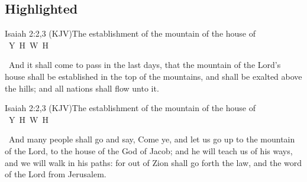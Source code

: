 \documentclass[12pt,aspectratio=169]{beamer}
\newcommand{\YA}{%
    \mbox{%
        Y\makebox[0pt][l]{\hspace{-0.178em}\raisebox{-0.00ex}{\scalebox{0.30}{E}}}%
        H\makebox[0pt][l]{\hspace{-0.010em}\raisebox{-0.00ex}{\scalebox{0.30}{O}}}%
        W\makebox[0pt][l]{\hspace{-0.245em}\raisebox{-0.00ex}{\scalebox{0.30}{A}}}%
        H%
    }%
}
\newcommand{\ver}[1]{%
    \raisebox{0.50ex}{%
        \scalebox{1.1}{%
            \pmb{\textbf{\textcolor{BSpbg}{#1}}}%
        }%
    }%
}
\newcommand{\QUOTE}[1]{%
    \par\noindent\hspace*{0.1\linewidth}%
    \begin{minipage}{0.8\linewidth}%
        \linespread{1.35}\large{#1}%
    \end{minipage}%
}
\newcommand{\RED}[1]{{\textcolor{TXred}{#1}}}
\newcommand{\YEL}[1]{{\textcolor{TXyel}{#1}}}
\newcommand{\GRE}[1]{{\textcolor{TXgre}{#1}}}
\newcommand{\CYA}[1]{{\textcolor{TXcya}{#1}}}
\newcommand{\BLU}[1]{{\textcolor{TXblu}{#1}}}
\newcommand{\MAG}[1]{{\textcolor{TXmag}{#1}}}
\begin{document}
    \subsection{Highlighted}

    \begin{frame}{Isaiah 2:2,3 (KJV)}{The establishment of the mountain of the house of \YA}
        \QUOTE{%
            \ver{2}~And \RED{it shall come to pass} in the last days, that the  mountain
            of the Lord's house shall  be  \YEL{established}  in  the  \CYA{top  of  the
            mountains}, and  shall  be  \CYA{exalted}  above  the  hills;  and  \GRE{all
            nations} shall flow unto it.
        }
    \end{frame}

    \begin{frame}{Isaiah 2:2,3 (KJV)}{The establishment of the mountain of the house of \YA}
        \QUOTE{%
            \ver{3}~And \GRE{many people} shall go and say, Come ye, and let us  \CYA{go
            up} to the mountain of the Lord, to the house of the \BLU{God of Jacob}; and
            he will \MAG{teach} us of his ways, and we will \MAG{walk} in his paths: for
            \YEL{out of Zion} shall go forth the \YEL{law,} and the  word  of  the  Lord
            \YEL{from Jerusalem}.
        }
    \end{frame}

\end{document}

